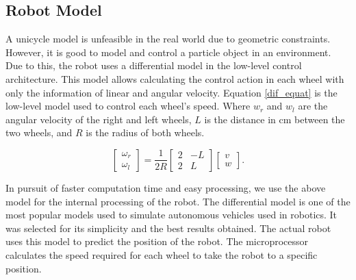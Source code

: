 



\subsection{Robot Model}
\label{robot_model}






A unicycle model is unfeasible in the real world due to geometric constraints. However, it is good to model and control a particle object in an environment. Due to this, the robot uses a differential model in the low-level control architecture. This model allows calculating the control action in each wheel with only the information of linear and angular velocity. Equation \eqref{dif_equat} is the low-level model used to control each wheel's speed. Where $w_{r}$ and $w_{l}$ are the angular velocity of the right and left wheels, $L$ is the distance in cm between the two wheels, and $R$ is the radius of both wheels.

\begin{equation}
\begin{bmatrix}
\omega_{r}\\ \omega_{l}
\end{bmatrix} =  \frac{1}{2R}\begin{bmatrix}
2 & -L\\ 
2 & L
\end{bmatrix} \begin{bmatrix}
v\\ w
\end{bmatrix}.
\label{dif_equat}
\end{equation}


In pursuit of faster computation time and easy processing, we use the above model for the internal processing of the robot. The differential model is one of the most popular models used to simulate autonomous vehicles used in robotics. It was selected for its simplicity and the best results obtained. 
The actual robot uses this model to predict the position of the robot. The microprocessor calculates the speed required for each wheel to take the robot to a specific position. 


